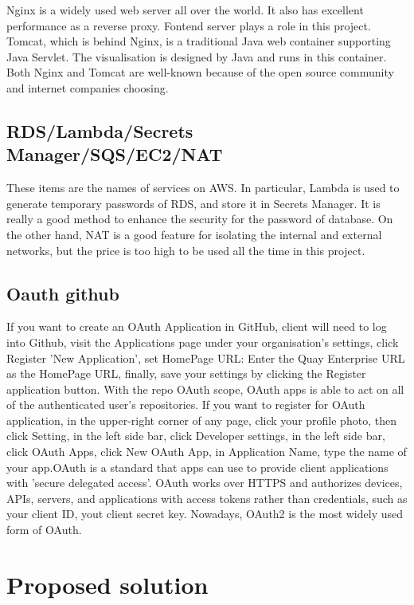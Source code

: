 \documentclass[conference]{IEEEtran}
\begin{document}
Nginx is a widely used web server all over the world. It also has excellent performance as a reverse proxy. 
Fontend server plays a role in this project. Tomcat, which is behind Nginx, is a traditional Java web container supporting 
Java Servlet. The visualisation is designed by Java and runs in this container. Both Nginx and Tomcat are well-known because of 
the open source community and internet companies choosing.

\subsection{RDS/Lambda/Secrets Manager/SQS/EC2/NAT}

These items are the names of services on AWS. In particular, Lambda is used to generate temporary passwords of RDS, and store it in 
Secrets Manager. It is really a good method to enhance the security for the password of database. On the other hand, NAT is a 
good feature for isolating the internal and external networks, but the price is too high to be used all the time in this project.

\subsection{Oauth github}
If you want to create an OAuth Application in GitHub, client will need to log into Github, visit
the Applications page under your organisation's settings, click Register 'New Application',
set HomePage URL: Enter the Quay Enterprise URL as the HomePage URL, finally, save your settings by
clicking the Register application button. With the repo OAuth scope, OAuth apps is able to act on
all of the authenticated user's repositories. If you want to register for OAuth application,
in the upper-right corner of any page, click your profile photo, then click Setting, in the
left side bar, click Developer settings, in the left side bar, click OAuth Apps, click New
OAuth App, in Application Name, type the name of your app.OAuth is a standard that apps can
use to provide client applications with 'secure delegated access'. OAuth works over HTTPS and
authorizes devices, APIs, servers, and applications with access tokens rather than credentials,
such as your client ID, yout client secret key. Nowadays, OAuth2 is the most widely used form of
OAuth.

\section{Proposed solution}
\end{document}
